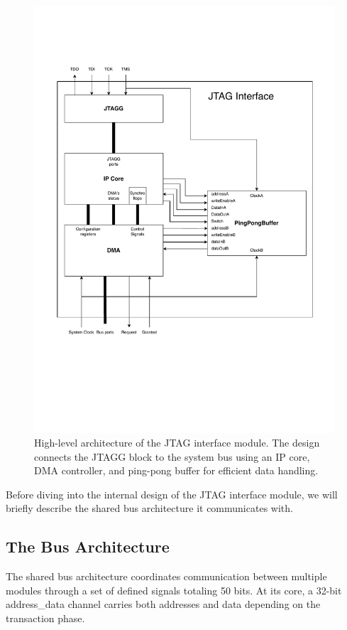 \documentclass[a4paper,11pt,oneside]{report}
\begin{document}
\begin{figure}[H]
    \centering
    \includegraphics[width=0.9\linewidth]{figures/jtag_interface_overview.pdf}
    \caption{High-level architecture of the JTAG interface module. The design connects the JTAGG block to the system bus using an IP core, DMA controller, and ping-pong buffer for efficient data handling.}
    \label{fig:big_picture}
\end{figure}

Before diving into the internal design of the JTAG interface module, we will briefly describe the shared bus architecture it communicates with.

\subsection{The Bus Architecture}

The shared bus architecture coordinates communication between multiple modules through a set of defined signals totaling 50 bits.
At its core, a 32-bit address\_data channel carries both addresses and data depending on the transaction phase.
\end{document}
